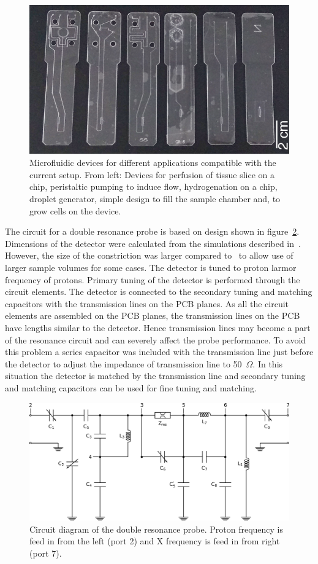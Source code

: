 \documentclass[preprint,12pt]{article}
\begin{document}
\begin{figure}
\centering
\includegraphics[width=.7\linewidth,keepaspectratio=true]{./figures/ms5n17-tlp-im-181007-devices.png} 
\caption{Microfluidic devices for different applications compatible with the current setup. From left: Devices for perfusion of tissue slice on a chip, peristaltic pumping to induce flow, hydrogenation on a chip, droplet generator, simple design to fill the sample chamber and, to grow cells on the device.}
\label{fig:device} 
\end{figure}
The circuit for a double resonance probe is based on design shown in figure~\ref{fig:circuit}. Dimensions of the detector were calculated from the simulations described in~\cite{gream_2016}. However, the size of the constriction was larger compared to~\cite{gream_2016} to allow use of larger sample volumes for some cases. The detector is tuned to proton larmor frequency of protons. Primary tuning of the detector is performed through the circuit elements. The detector is connected to the secondary tuning and matching capacitors with the transmission lines on the PCB planes. As all the circuit elements are assembled on the PCB planes, the transmission lines on the PCB have lengths similar to the detector. Hence transmission lines may become a part of the resonance circuit and can severely affect the probe performance. To avoid this problem a series capacitor was included with the transmission line just before the detector to adjust the impedance of transmission line to 50~$\Omega$. In this situation the detector is matched by the transmission line and secondary tuning and matching capacitors can be used for fine tuning and matching.\par
\begin{figure}
\centering
\includegraphics[width=.7\linewidth,keepaspectratio=true]{./figures/ms5n17-tlp-im-180110-circuit-diagram.png}
\caption{Circuit diagram of the double resonance probe. Proton frequency is feed in from the left (port 2) and X frequency is feed in from right (port 7).}
\label{fig:circuit}
\end{figure}
\end{document}
